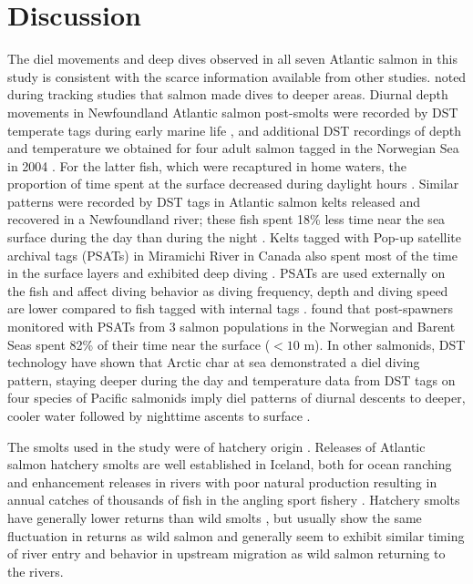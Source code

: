 \section{Discussion}
\label{Dis}
The diel movements and deep dives observed in all seven Atlantic salmon in this study is consistent with the scarce information available from other studies. 
\cite{Westerberg1982a} noted during tracking studies that salmon made dives to deeper areas. 
Diurnal depth movements in Newfoundland Atlantic salmon post-smolts were recorded by DST temperate tags during early marine life \citep{Reddin2006}, and additional DST recordings of depth and temperature we obtained for four adult salmon tagged in the Norwegian Sea in 2004 \citep{Holm2006}. 
For the latter fish, which were recaptured in home waters, the proportion of time spent at the surface decreased during daylight hours \citep{Holm2006}. 
Similar patterns were recorded by DST tags in Atlantic salmon kelts released and recovered in a Newfoundland river; these fish spent 18\% less time near the sea surface during the day than during the night \citep{Reddin2011}. 
Kelts tagged with Pop-up satellite archival tags (PSATs) in Miramichi River in Canada also spent most of the time in the surface layers and exhibited deep diving \citep{Strom2017}. 
PSATs are used externally on the fish and affect diving behavior as diving frequency, depth and diving speed are lower compared to fish tagged with internal tags \citep{Hedger2016}. 
\citet{Hedger2017} found that post-spawners monitored with PSATs from 3 salmon populations in the Norwegian and Barent Seas spent 82\% of their time near the surface ($<10$ m).
In other salmonids, DST technology have shown that Arctic char at sea demonstrated a diel diving pattern, staying deeper during the day \citep{Rikardsen2007} and temperature data from DST tags on four species of Pacific salmonids imply diel patterns of diurnal descents to deeper, cooler water followed by nighttime ascents to surface \citep{Walker2000}.

The smolts used in the study were of hatchery origin \citep{Gudjonsson2015}. 
Releases of Atlantic salmon hatchery smolts are well established in Iceland, both for ocean ranching and enhancement releases in rivers with poor natural production resulting in annual catches of thousands of fish in the angling sport fishery \citep{Thordardottir2017}.   
Hatchery smolts have generally lower returns than wild smolts \citep{ICES2018}, but usually show the same fluctuation in returns as wild salmon \citep{Johannsson1996} and generally seem to exhibit similar timing of river entry and behavior in upstream migration as wild salmon returning to the rivers.

